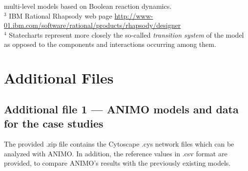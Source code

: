 \documentclass{bmcart}
\begin{document}
\begin{backmatter}
\begin{table}[!hbt]
{multi-level models based on Boolean reaction dynamics.\\
$^3$ {IBM Rational Rhapsody} web page \protect\url{http://www-01.ibm.com/software/rational/products/rhapsody/designer}\\
$^4$ Statecharts represent more closely the so-called \protect\emph{transition system} of the model as opposed to the components and interactions occurring among them.
\label{tab:tool-comparison}}
\end{table}



\clearpage

\section*{Additional Files}
  \subsection*{Additional file 1 --- ANIMO models and data for the case studies}
      The provided .zip file contains the Cytoscape .cys network files which can be analyzed
      with ANIMO. In addition, the reference values in .csv format are provided, to compare
      ANIMO's results with the previously existing models.


\end{backmatter}



\appendix
\clearpage
\setcounter{figure}{0}
\setcounter{table}{0}
\setcounter{page}{1}
\onecolumn



%
\end{document}
